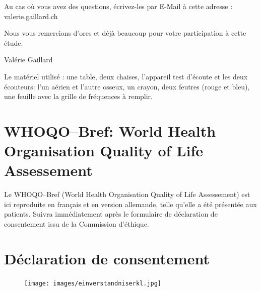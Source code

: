 Au cas où vous avez des questions, écrivez-les par E-Mail à cette adresse : valerie.gaillard\@gmx.ch

Nous vous remercions d'ores et déjà beaucoup pour votre participation
à cette étude.

Valérie Gaillard


\begin{french}
	Le matériel utilisé : une table, deux chaises, l'appareil
	test d'écoute et les deux écouteurs: l'un aérien et l'autre osseux, un crayon, deux
	feutres (rouge et bleu), une feuille avec la grille de fréquences à
	remplir.
\end{french}

\section{WHOQO--Bref: World Health
   Organisation Quality of Life Assessement}

Le WHOQO--Bref (World Health
   Organisation Quality of Life Assessement) est ici reproduite en
   français et en
   version allemande, telle qu'elle a été présentée aux patients.
Suivra immédiatement après le  formulaire de déclaration de  consentement issu de la Commission 
d'éthique.











\clearpage
\section{Déclaration de consentement}
\begin{figure}[bh]
	\centering
	\texttt{[image: images/einverstandniserkl.jpg]}
	\label{fig:déclaration de consentement}
\end{figure}


